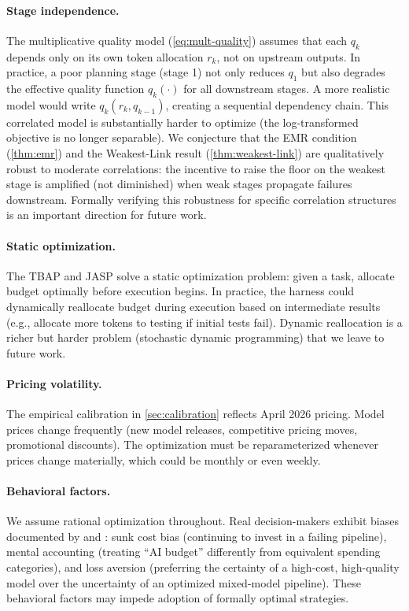 \documentclass[11pt, a4paper, logo, copyright]{googledeepmind}
\begin{document}
\paragraph{Stage independence.}
The multiplicative quality model (\cref{eq:mult-quality}) assumes that each $q_k$ depends only on its own token allocation $r_k$, not on upstream outputs. In practice, a poor planning stage (stage 1) not only reduces $q_1$ but also degrades the effective quality function $q_k(\cdot)$ for all downstream stages. A more realistic model would write $q_k(r_k, q_{k-1})$, creating a sequential dependency chain. This correlated model is substantially harder to optimize (the log-transformed objective is no longer separable). We conjecture that the EMR condition (\cref{thm:emr}) and the Weakest-Link result (\cref{thm:weakest-link}) are qualitatively robust to moderate correlations: the incentive to raise the floor on the weakest stage is amplified (not diminished) when weak stages propagate failures downstream. Formally verifying this robustness for specific correlation structures is an important direction for future work.

\paragraph{Static optimization.}
The TBAP and JASP solve a static optimization problem: given a task, allocate budget optimally before execution begins. In practice, the harness could dynamically reallocate budget during execution based on intermediate results (e.g., allocate more tokens to testing if initial tests fail). Dynamic reallocation is a richer but harder problem (stochastic dynamic programming) that we leave to future work.

\paragraph{Pricing volatility.}
The empirical calibration in \cref{sec:calibration} reflects April 2026 pricing. Model prices change frequently (new model releases, competitive pricing moves, promotional discounts). The optimization must be reparameterized whenever prices change materially, which could be monthly or even weekly.

\paragraph{Behavioral factors.}
We assume rational optimization throughout. Real decision-makers exhibit biases documented by \citet{kahneman1979} and \citet{thaler1999}: sunk cost bias (continuing to invest in a failing pipeline), mental accounting (treating ``AI budget'' differently from equivalent spending categories), and loss aversion (preferring the certainty of a high-cost, high-quality model over the uncertainty of an optimized mixed-model pipeline). These behavioral factors may impede adoption of formally optimal strategies.
\end{document}
